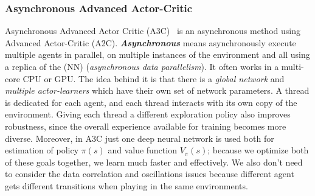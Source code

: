 \subsubsection{Asynchronous Advanced Actor-Critic}
Asynchronous Advanced Actor Critic (A3C)~\parencite{mnih2016asynchronous} is an asynchronous method using Advanced Actor-Critic (A2C). \textit{\textbf{Asynchronous}} means asynchronously execute multiple agents in parallel, on multiple instances of the environment and all using a replica of the   (NN) (\textit{asynchronous data parallelism}). It often works in a multi-core CPU or GPU. The idea behind it is that there is a \textit{global network} and \textit{multiple actor-learners} which have their own set of network parameters. A thread is dedicated for each agent, and each thread interacts with its own copy of the environment.
Giving each thread a different exploration policy also improves robustness, since the overall experience available for training becomes more diverse. Moreover, in A3C just one deep neural network is used both for estimation of policy $\pi(s)$ and value function $V_{\pi}(s)$; because we optimize both of these goals together, we learn much faster and effectively. We also don’t need to consider the data correlation and oscillations issues because different agent gets different transitions when playing in the same environments.

